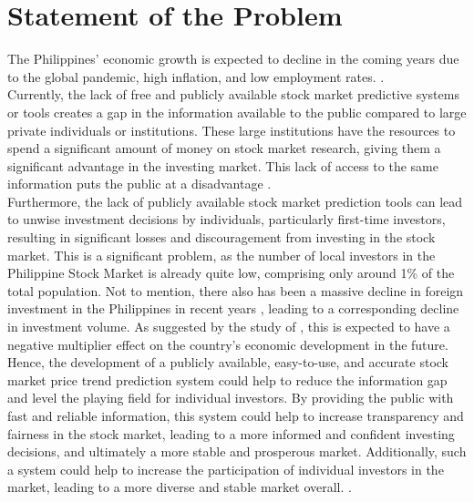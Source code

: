 \section{Statement of the Problem}
\label{sec:problem}
The Philippines' economic growth is expected to decline in the coming 
years due to the global pandemic, high inflation, and low employment rates. 
\cite{Alegado2022,Canto2022,Reuters2022}.
\hfill \\

Currently, the lack of free and publicly available stock market predictive systems or
 tools creates a gap in the information available to the public compared to large private 
 individuals or institutions. These large institutions have the resources to spend a significant 
 amount of money on stock market research, giving them a significant advantage in the investing 
 market. This lack of access to the same information puts the public at a disadvantage
 \cite{Kim2022}. 
 \hfill \\
 
Furthermore, the lack of publicly available stock market prediction tools can 
lead to unwise investment decisions by individuals, particularly first-time investors, 
resulting in significant losses and discouragement from investing in the stock market. 
This is a significant problem, as the number of local investors in the Philippine Stock Market 
is already quite low, comprising only around 1\% of 
the total population. Not to mention, there also has been a massive decline in 
foreign investment  in the Philippines in recent years 
 \cite{BusinessWorld2022}, 
 leading to a corresponding decline in investment volume. 
 As suggested by the study of , 
 this is expected to have a negative multiplier effect on the country's 
 economic development in the future. 
 \hfill \\
 
 Hence, the development of a publicly available, easy-to-use, and
 accurate stock market price trend prediction system could help to 
 reduce the information gap and level the playing field for individual investors. 
 By providing the public with fast and reliable information, this system could help to
  increase transparency and fairness in the stock market, leading to a more informed 
  and confident investing decisions, and ultimately a more stable and prosperous market.
   Additionally, such a system could help to increase the participation of individual 
   investors in the market, leading to a more diverse and stable market overall.
\cite{Statista2022,POPCOMM2021}.
\hfill \\

